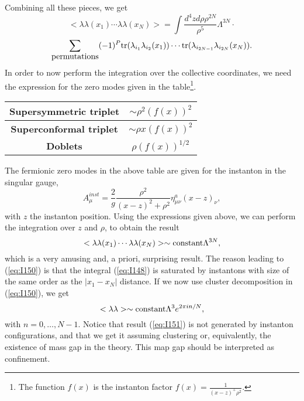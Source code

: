 Combining all these pieces, we get
\[
<\lambda \lambda(x_1) \cdots \lambda \lambda(x_N)> = \int \frac
{d^4 z d\rho \rho^{2N}}{\rho^{5}} \Lambda^{3N} \cdot \]
\begin{equation}
\sum_{\hbox {permutations}} (-1)^{P} \hbox {tr} (\lambda_{i_1} \lambda_{i_2}(x_1)) \cdots \hbox 
{tr} (\lambda_{i_{2N-1}} \lambda_{i_{2N}}(x_N)).
\label{eq:I148}
\end{equation}
In order to now perform the integration over the collective
coordinates, we need the expression for the zero modes given in
the table\footnote{The function $f(x)$ is the instanton factor $f(x)=
\frac {1}{(x-z)^+\rho^2}$.}.


\begin{center}

\begin{tabular}{|c|c|}     \hline\hline
	 {\bf Supersymmetric triplet}    & $\sim \rho^2 (f(x))^2$ \\ \hline
	 {\bf Superconformal triplet}    & $\sim \rho x (f(x))^2$ \\ \hline 
	 {\bf Doblets}                   & $\rho (f(x))^{1/2}$ \\ \hline\hline

\end{tabular}
\label{tab:2}
\end{center}

  
The fermionic zero modes in the above table are given for the
instanton in the singular gauge,
\begin{equation}
A_{\mu}^{inst} = \frac {2}{g} \frac {\rho^2}{(x-z)^2+\rho^2}
\eta_{\mu \nu}^{a} (x-z)_{\nu},
\label{eq:I149}
\end{equation}
with $z$ the instanton position. Using the expressions given above, we can perform the integration over $z$ and $\rho$,
to obtain the result
\begin{equation}
<\lambda \lambda(x_1) \cdots \lambda \lambda(x_N)> \sim \hbox
{constant} \Lambda^{3N},
\label{eq:I150}
\end{equation}
which is a very amusing and, a priori, surprising result. The
reason leading to (\ref{eq:I150}) is that the integral
(\ref{eq:I148}) is saturated by instantons with size of the same
order as the $|x_1-x_N|$ distance. If we now use cluster
decomposition in (\ref{eq:I150}), we get
\begin{equation}
<\lambda \lambda> \sim \hbox {constant} \Lambda^3 e^{2\pi i n/N},
\label{eq:I151}
\end{equation}
with $n=0,\ldots,N-1$. Notice that result (\ref{eq:I151}) is not
generated by instanton configurations, and that we get it
assuming clustering or, equivalently, the existence of mass gap
in the theory. This map gap should be
interpreted as confinement.
  
